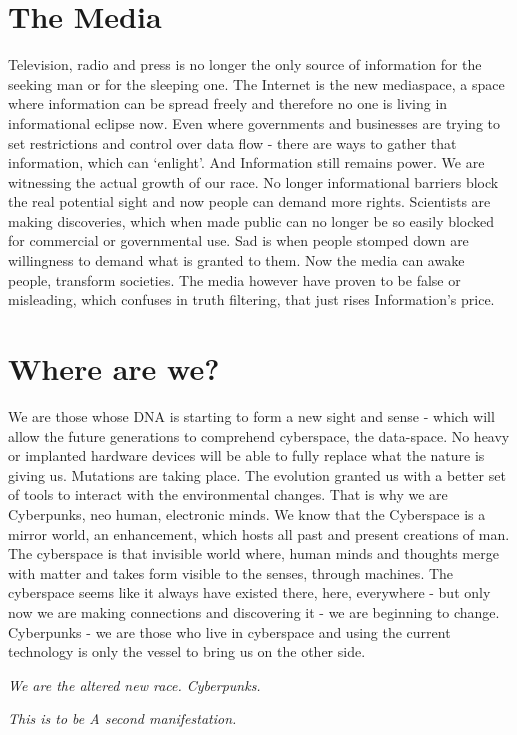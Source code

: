 \documentclass[letterpaper,12pt,english]{sphinxmanual}
\begin{document}
\section{The Media}
\label{2003:the-media}
Television, radio and press is no longer the only source of information for the seeking man or for the sleeping one. The Internet is the new mediaspace, a space where information can be spread freely and therefore no one is living in informational eclipse now. Even where governments and businesses are trying to set restrictions and control over data flow - there are ways to gather that information, which can `enlight'. And Information still remains power. We are witnessing the actual growth of our race. No longer informational barriers block the real potential sight and now people can demand more rights. Scientists are making discoveries, which when made public can no longer be so easily blocked for commercial or governmental use. Sad is when people stomped down are willingness to demand what is granted to them. Now the media can awake people, transform societies. The media however have proven to be false or misleading, which confuses in truth filtering, that just rises Information's price.


\section{Where are we?}
\label{2003:where-are-we}
We are those whose DNA is starting to form a new sight and sense - which will allow the future generations to comprehend cyberspace, the data-space. No heavy or implanted hardware devices will be able to fully replace what the nature is giving us. Mutations are taking place. The evolution granted us with a better set of tools to interact with the environmental changes. That is why we are Cyberpunks, neo human, electronic minds. We know that the Cyberspace is a mirror world, an enhancement, which hosts all past and present creations of man. The cyberspace is that invisible world where, human minds and thoughts merge with matter and takes form visible to the senses, through machines. The cyberspace seems like it always have existed there, here, everywhere - but only now we are making connections and discovering it - we are beginning to change. Cyberpunks - we are those who live in cyberspace and using the current technology is only the vessel to bring us on the other side.

\emph{We are the altered new race. Cyberpunks.}

\emph{This is to be A second manifestation.}
\end{document}
